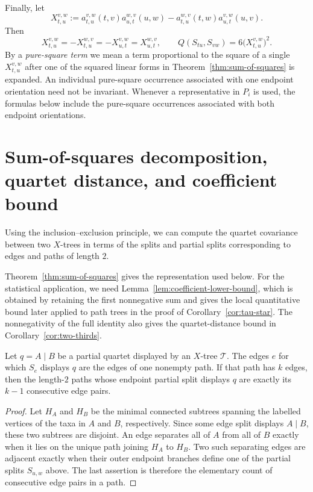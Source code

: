 \documentclass[12pt]{article}
\begin{document}
Finally, let
\begin{equation}\label{eq:edge-covariance-variable}
X_{t,u}^{v,w}:=
a_{t,u}^{v,w}(t,v)a_{u,t}^{w,v}(u,w)
-a_{t,u}^{w,v}(t,w)a_{u,t}^{v,w}(u,v).
\end{equation}
Then
\begin{equation}\label{eq:edge-covariance-orientations}
X_{t,u}^{v,w}=-X_{t,u}^{w,v}=-X_{u,t}^{v,w}=X_{u,t}^{w,v},
\qquad
Q(S_{tu},S_{vw})=6\bigl(X_{t,u}^{v,w}\bigr)^2.
\end{equation}
By a \emph{pure-square term} we mean a term proportional to the square of a
single $X_{t,u}^{v,w}$ after one of the squared linear forms in
Theorem~\ref{thm:sum-of-squares} is expanded.  An individual pure-square
occurrence associated with one endpoint orientation need not be invariant.
Whenever a representative in $P_i$ is used, the formulas below include the
pure-square occurrences associated with both endpoint orientations.

\section{Sum-of-squares decomposition, quartet distance, and coefficient bound}
\label{sec:sos}

Using the inclusion--exclusion principle, we can compute the quartet
covariance between two $X$-trees in terms of the splits and partial
splits corresponding to edges and paths of length $2$.

Theorem~\ref{thm:sum-of-squares} gives the representation used below.  For the
statistical application, we need Lemma~\ref{lem:coefficient-lower-bound},
which is obtained by retaining the first nonnegative sum and gives the local
quantitative bound later applied to path trees in the proof of
Corollary~\ref{cor:tau-star}.  The nonnegativity of the full identity also
gives the quartet-distance bound in Corollary~\ref{cor:two-thirds}.

\begin{lemma}\label{lem:display-path}
Let $q=A\mid B$ be a partial quartet displayed by an $X$-tree
$\mathcal T$.  The edges $e$ for which $S_e$ displays $q$ are the edges of
one nonempty path.  If that path has $k$ edges, then the length-$2$ paths
whose endpoint partial split displays $q$ are exactly its $k-1$ consecutive
edge pairs.
\end{lemma}

\begin{proof}
Let $H_A$ and $H_B$ be the minimal connected subtrees spanning the labelled
vertices of the taxa in $A$ and $B$, respectively.  Since some edge split
displays $A\mid B$, these two subtrees are disjoint.  An edge separates all
of $A$ from all of $B$ exactly when it lies on the unique path joining
$H_A$ to $H_B$.  Two such separating edges are adjacent exactly when their
outer endpoint branches define one of the partial splits $S_{u,w}$ above.
The last assertion is therefore the elementary count of consecutive edge
pairs in a path.
\end{proof}
\end{document}
